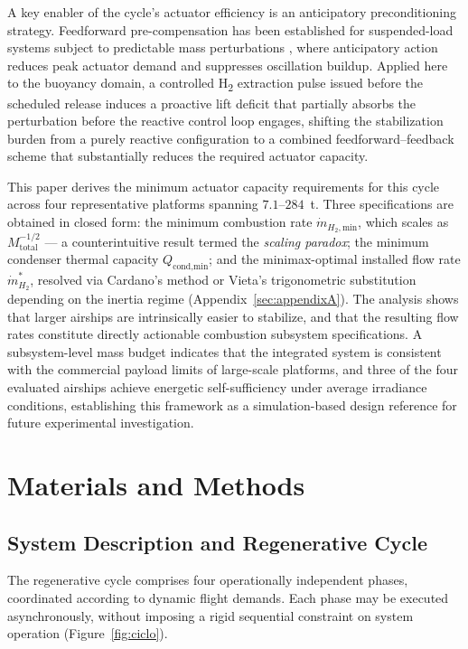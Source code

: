 \documentclass[applsci,article,submit,pdftex,moreauthors]{Definitions/mdpi}
\newcommand{\dotmmin}{\dot{m}_{H_2,\text{min}}}
\newcommand{\dotmstar}{\dot{m}_{H_2}^{*}}
\newcommand{\added}[1]{#1}
\begin{document}
\added{A key enabler of the cycle's actuator efficiency is an anticipatory preconditioning strategy.
Feedforward pre-compensation has been established for suspended-load systems subject to predictable
mass perturbations \cite{Kowsari2024}, where anticipatory action reduces peak actuator
demand and suppresses oscillation buildup. Applied here to the buoyancy domain, a controlled
H\textsubscript{2} extraction pulse issued before the scheduled release induces a proactive lift
deficit that partially absorbs the perturbation before the reactive control loop engages, shifting
the stabilization burden from a purely reactive configuration to a combined feedforward--feedback
scheme that substantially reduces the required actuator capacity.}

\added{This paper derives the minimum actuator capacity requirements for this cycle across four
representative platforms spanning $7.1$--$284$~t. Three specifications are obtained in closed form:
the minimum combustion rate $\dotmmin$, which scales as $M_\text{total}^{-1/2}$ --- a
counterintuitive result termed the \emph{scaling paradox}; the minimum condenser thermal capacity
$Q_\text{cond,min}$; and the minimax-optimal installed flow rate $\dotmstar$, resolved via
Cardano's method or Vieta's trigonometric substitution depending on the inertia regime
(Appendix~\ref{sec:appendixA}). The analysis shows that larger airships are intrinsically easier to stabilize, and that the resulting flow rates constitute directly actionable combustion subsystem specifications. A subsystem-level mass budget indicates that the integrated system is consistent with the commercial payload limits of large-scale platforms, and three of the four evaluated airships achieve energetic self-sufficiency under average irradiance conditions, establishing this framework as a simulation-based design reference for future experimental investigation.}

\section{Materials and Methods}
\label{sec:methods}
\subsection{System Description and Regenerative Cycle}

The regenerative cycle comprises four operationally independent phases, coordinated according to dynamic flight demands. Each phase may be executed asynchronously, without imposing a rigid sequential constraint on system operation (Figure~\ref{fig:ciclo}).
\end{document}
